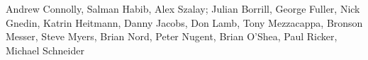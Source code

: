 Andrew Connolly, Salman Habib, Alex Szalay; Julian Borrill, George
Fuller, Nick Gnedin, Katrin Heitmann, Danny Jacobs, Don Lamb, Tony
Mezzacappa, Bronson Messer, Steve Myers, Brian Nord, Peter Nugent,
Brian O'Shea, Paul Ricker, Michael Schneider